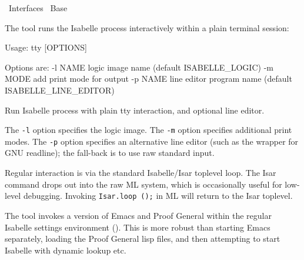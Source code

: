 %
\begin{isabellebody}%
\def\isabellecontext{Interfaces}%
%
\isadelimtheory
%
\endisadelimtheory
%
\isatagtheory
{}\isamarkupfalse%
\ Interfaces\isanewline
{}\ Base\isanewline
{}%
\endisatagtheory
{\isafoldtheory}%
%
\isadelimtheory
%
\endisadelimtheory
%
\isamarkuptrue%
%
\isamarkuptrue%
%
\begin{isamarkuptext}%
The \hypertarget{tool.tty}{\hyperlink{tool.tty}{\mbox{}}} tool runs the Isabelle process interactively
  within a plain terminal session:
\begin{ttbox}
Usage: tty [OPTIONS]

  Options are:
    -l NAME      logic image name (default ISABELLE_LOGIC)
    -m MODE      add print mode for output
    -p NAME      line editor program name (default ISABELLE_LINE_EDITOR)

  Run Isabelle process with plain tty interaction, and optional line editor.
\end{ttbox}

  The \verb|-l| option specifies the logic image.  The
  \verb|-m| option specifies additional print modes.  The
  \verb|-p| option specifies an alternative line editor (such
  as the \hypertarget{executable.rlwrap}{\hyperlink{executable.rlwrap}{\mbox{}}} wrapper for GNU readline); the
  fall-back is to use raw standard input.

  Regular interaction is via the standard Isabelle/Isar toplevel loop.
  The Isar command \hyperlink{command.exit}{\mbox{}} drops out into the raw ML system,
  which is occasionally useful for low-level debugging.  Invoking \verb|Isar.loop|~\verb|();| in ML will return to the Isar toplevel.%
\end{isamarkuptext}%
\isamarkuptrue%
%
\isamarkuptrue%
%
\begin{isamarkuptext}%
The \hypertarget{tool.emacs}{\hyperlink{tool.emacs}{\mbox{}}} tool invokes a version of Emacs and Proof
  General within the regular Isabelle settings environment
  ().  This is more robust than starting Emacs
  separately, loading the Proof General lisp files, and then
  attempting to start Isabelle with dynamic \hyperlink{setting.PATH}{\mbox{}} lookup
  etc.


\end{isamarkuptext}
\end{isabellebody}
